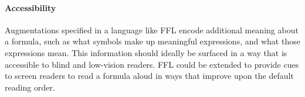 \paragraph{Accessibility}
Augmentations specified in a language like FFL encode additional meaning about a formula, such as what symbols make up meaningful expressions, and what those expressions mean. This information should ideally be surfaced in a way that is accessible to blind and low-vision readers. FFL could be extended to provide cues to screen readers to read a formula aloud in ways that improve upon the default reading order.




